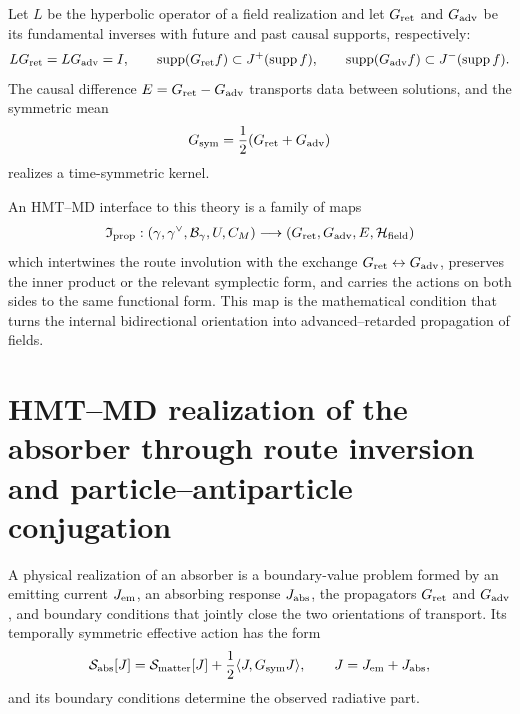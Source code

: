 Let $L$ be the hyperbolic operator of a field realization and let
$G_{\rm ret}$ and $G_{\rm adv}$ be its fundamental inverses with future and past
causal supports, respectively:
\begin{equation}
 LG_{\rm ret}=LG_{\rm adv}=I,
 \qquad
 \operatorname{supp}(G_{\rm ret}f)\subset J^+(\operatorname{supp}f),
 \qquad
 \operatorname{supp}(G_{\rm adv}f)\subset J^-(\operatorname{supp}f).
 \label{eq:mt-green-avanzado-retardado}
\end{equation}
The causal difference
$E=G_{\rm ret}-G_{\rm adv}$ transports data between solutions, and the symmetric
mean
\[
 G_{\rm sym}=\frac12(G_{\rm ret}+G_{\rm adv})
\]
realizes a time-symmetric kernel.

An HMT--MD interface to this theory is a family of maps
\begin{equation}
 \mathfrak I_{\rm prop}:
 (\gamma,\gamma^\vee,\mathcal B_\gamma,U,C_M)
 \longrightarrow
 (G_{\rm ret},G_{\rm adv},E,\mathcal H_{\rm field})
 \label{eq:mt-interfaz-green}
\end{equation}
which intertwines the route involution with the exchange
$G_{\rm ret}\leftrightarrow G_{\rm adv}$, preserves the inner product or the
relevant symplectic form, and carries the actions on both sides to the same
functional form. This map is the mathematical condition that turns the
internal bidirectional orientation into advanced--retarded propagation of
fields.

\section{HMT--MD realization of the absorber through route inversion and particle--antiparticle conjugation}

\begin{definicionnarrativa}[title={Bidirectional emission--absorption system}]
\label{def:mt-absorbedor}
A physical realization of an absorber is a boundary-value problem formed by
an emitting current $J_{\rm em}$, an absorbing response $J_{\rm abs}$,
the propagators $G_{\rm ret}$ and $G_{\rm adv}$, and boundary conditions that
jointly close the two orientations of transport. Its temporally symmetric
effective action has the form
\begin{equation}
 \mathcal S_{\rm abs}[J]
 =\mathcal S_{\rm matter}[J]
 +\frac12\langle J,G_{\rm sym}J\rangle,
 \qquad J=J_{\rm em}+J_{\rm abs},
 \label{eq:mt-accion-absorbedor}
\end{equation}
and its boundary conditions determine the observed radiative part.
\end{definicionnarrativa}

